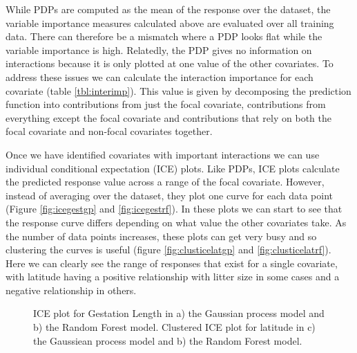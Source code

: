 \documentclass[10pt,]{article}
\begin{document}
While PDPs are computed as the mean of the response over the dataset, the variable importance measures calculated above are evaluated over all training data.
There can therefore be a mismatch where a PDP looks flat while the variable importance is high.
Relatedly, the PDP gives no information on interactions because it is only plotted at one value of the other covariates.
To address these issues we can calculate the interaction importance for each covariate (table \ref{tbl:interimp}).
This value is given by decomposing the prediction function into contributions from just the focal covariate, contributions from everything except the focal covariate and contributions that rely on both the focal covariate and non-focal covariates together.


Once we have identified covariates with important interactions we can use individual conditional expectation (ICE) plots.
Like PDPs, ICE plots calculate the predicted response value across a range of the focal covariate.
However, instead of averaging over the dataset, they plot one curve for each data point (Figure \ref{fig:icegestgp} and \ref{fig:icegestrf}).
In these plots we can start to see that the response curve differs depending on what value the other covariates take.
As the number of data points increases, these plots can get very busy and so clustering the curves is useful (figure \ref{fig:clusticelatgp} and \ref{fig:clusticelatrf}).
Here we can clearly see the range of responses that exist for a single covariate, with latitude having a positive relationship with litter size in some cases and a negative relationship in others.



\begin{figure}[t!]
  \centering


  \label{fig:ice}
  \caption{
    ICE plot for Gestation Length in a) the Gaussian process model and b) the Random Forest model.
    Clustered ICE plot for latitude in c) the Gaussiean process model and b) the Random Forest model.
  }
\end{figure}
\end{document}
